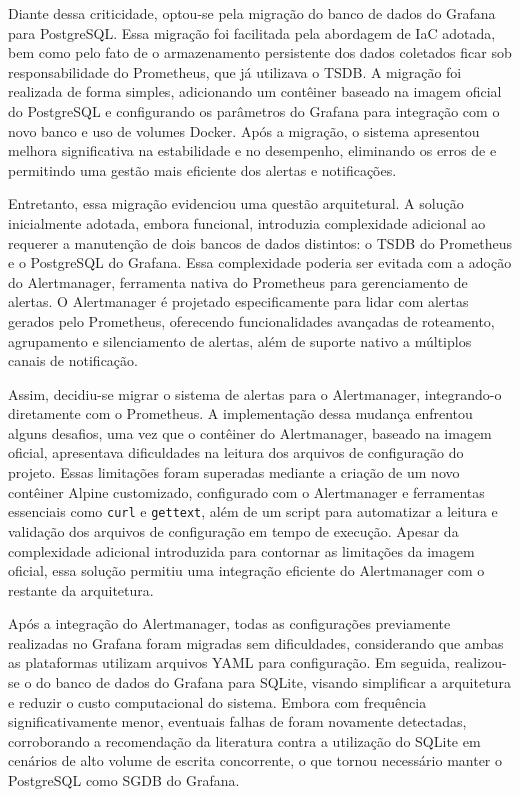 Diante dessa criticidade, optou-se pela migração do banco de dados do Grafana para PostgreSQL. Essa migração foi facilitada pela abordagem de IaC adotada, bem como pelo fato de o armazenamento persistente dos dados coletados ficar sob responsabilidade do Prometheus, que já utilizava o TSDB. A migração foi realizada de forma simples, adicionando um contêiner baseado na imagem oficial do PostgreSQL e configurando os parâmetros do Grafana para integração com o novo banco e uso de volumes Docker. Após a migração, o sistema apresentou melhora significativa na estabilidade e no desempenho, eliminando os erros de  e permitindo uma gestão mais eficiente dos alertas e notificações.

Entretanto, essa migração evidenciou uma questão arquitetural. A solução inicialmente adotada, embora funcional, introduzia complexidade adicional ao requerer a manutenção de dois bancos de dados distintos: o TSDB do Prometheus e o PostgreSQL do Grafana. Essa complexidade poderia ser evitada com a adoção do Alertmanager, ferramenta nativa do Prometheus para gerenciamento de alertas. O Alertmanager é projetado especificamente para lidar com alertas gerados pelo Prometheus, oferecendo funcionalidades avançadas de roteamento, agrupamento e silenciamento de alertas, além de suporte nativo a múltiplos canais de notificação.

Assim, decidiu-se migrar o sistema de alertas para o Alertmanager, integrando-o diretamente com o Prometheus. A implementação dessa mudança enfrentou alguns desafios, uma vez que o contêiner do Alertmanager, baseado na imagem oficial, apresentava dificuldades na leitura dos arquivos de configuração do projeto. Essas limitações foram superadas mediante a criação de um novo contêiner Alpine customizado, configurado com o Alertmanager e ferramentas essenciais como \verb|curl| e \verb|gettext|, além de um script para automatizar a leitura e validação dos arquivos de configuração em tempo de execução. Apesar da complexidade adicional introduzida para contornar as limitações da imagem oficial, essa solução permitiu uma integração eficiente do Alertmanager com o restante da arquitetura.

Após a integração do Alertmanager, todas as configurações previamente realizadas no Grafana foram migradas sem dificuldades, considerando que ambas as plataformas utilizam arquivos YAML para configuração. Em seguida, realizou-se o  do banco de dados do Grafana para SQLite, visando simplificar a arquitetura e reduzir o custo computacional do sistema. Embora com frequência significativamente menor, eventuais falhas de  foram novamente detectadas, corroborando a recomendação da literatura contra a utilização do SQLite em cenários de alto volume de escrita concorrente, o que tornou necessário manter o PostgreSQL como SGDB do Grafana.

